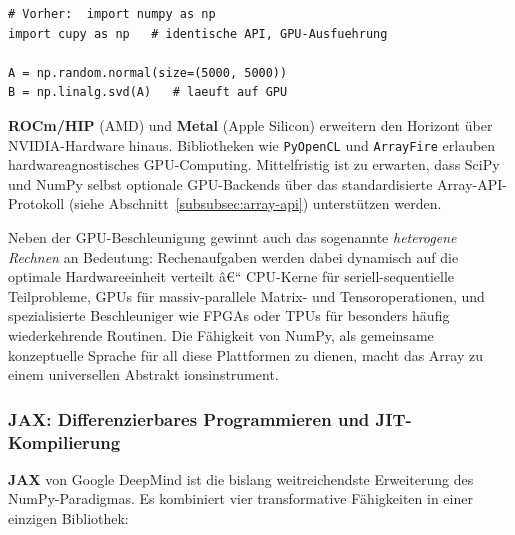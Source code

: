 \documentclass[12pt, a4paper]{article}
\begin{document}
\begin{lstlisting}[caption={CuPy als Drop-in-Ersatz fuer NumPy}]
# Vorher:  import numpy as np
import cupy as np   # identische API, GPU-Ausfuehrung

A = np.random.normal(size=(5000, 5000))
B = np.linalg.svd(A)   # laeuft auf GPU
\end{lstlisting}

\textbf{ROCm/HIP} (AMD) und \textbf{Metal} (Apple Silicon) erweitern
den Horizont über NVIDIA-Hardware hinaus. Bibliotheken wie
\texttt{PyOpenCL} und \texttt{ArrayFire} erlauben hardwareagnostisches
GPU-Computing. Mittelfristig ist zu erwarten, dass SciPy und NumPy selbst
optionale GPU-Backends über das standardisierte Array-API-Protokoll
(siehe Abschnitt~\ref{subsubsec:array-api}) unterstützen werden.

Neben der GPU-Beschleunigung gewinnt auch das sogenannte \emph{heterogene
Rechnen} an Bedeutung: Rechenaufgaben werden dabei dynamisch auf die
optimale Hardwareeinheit verteilt â€“ CPU-Kerne für seriell-sequentielle
Teilprobleme, GPUs für massiv-parallele Matrix- und Tensoroperationen,
und spezialisierte Beschleuniger wie FPGAs oder TPUs für besonders
häufig wiederkehrende Routinen. Die Fähigkeit von NumPy, als gemeinsame
konzeptuelle Sprache für all diese Plattformen zu dienen, macht das Array
zu einem universellen Abstrakt ionsinstrument.

\subsubsection{JAX: Differenzierbares Programmieren und JIT-Kompilierung}
\label{subsubsec:jax}

\textbf{JAX} \cite{bradbury2018jax} von Google DeepMind ist die bislang
weitreichendste Erweiterung des NumPy-Paradigmas. Es kombiniert vier
transformative Fähigkeiten in einer einzigen Bibliothek:
\end{document}
